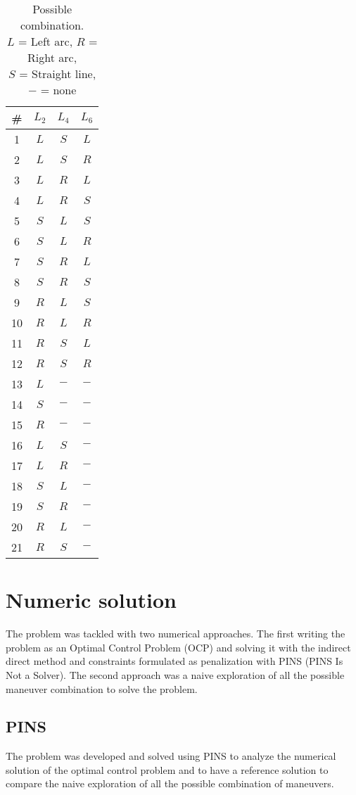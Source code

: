 \documentclass[11pt,twocolumn]{scrartcl}
\begin{document}
%
\begin{table}[ht]
  \centering
  \begin{tabular}{c|c|c|c}
  \hline
  \textbf{\#} & \textbf{$L_2$} & \textbf{$L_4$} & \textbf{$L_6$} \\
  \hline
  1 & $L$ & $S$ & $L$  \\
  2 & $L$ & $S$ & $R$  \\
  3 & $L$ & $R$ & $L$  \\
  4 & $L$ & $R$ & $S$  \\
  5 & $S$ & $L$ & $S$  \\
  6 & $S$ & $L$ & $R$  \\
  7 & $S$ & $R$ & $L$  \\
  8 & $S$ & $R$ & $S$  \\
  9 & $R$ & $L$ & $S$  \\
  10 & $R$ & $L$ & $R$  \\
  11 & $R$ & $S$ & $L$  \\
  12 & $R$ & $S$ & $R$  \\
  13 & $L$ & $-$ & $-$  \\
  14 & $S$ & $-$ & $-$  \\
  15 & $R$ & $-$ & $-$  \\
  16 & $L$ & $S$ & $-$  \\
  17 & $L$ & $R$ & $-$  \\
  18 & $S$ & $L$ & $-$  \\
  19 & $S$ & $R$ & $-$  \\
  20 & $R$ & $L$ & $-$  \\
  21 & $R$ & $S$ & $-$  \\
  \hline
  \end{tabular}
  \caption{Possible combination.\\ $L$ = Left arc, $R$ = Right arc,\\$S$ = Straight line, $-$ = none}
  \label{tab:possiblecombination}
\end{table}
%
\section*{Numeric solution}
%
The problem was tackled with two numerical approaches. The first writing the problem as an Optimal Control Problem (OCP) and solving it with the indirect direct method and constraints formulated as penalization with PINS (PINS Is Not a Solver)\cite{biral2016notes}. The second approach was a naive exploration of all the possible maneuver combination to solve the problem.
%
\subsection*{PINS}
%
The problem was developed and solved using PINS to analyze the numerical solution of the optimal control problem and to have a reference solution to compare the naive exploration of all the possible combination of maneuvers.
\end{document}

